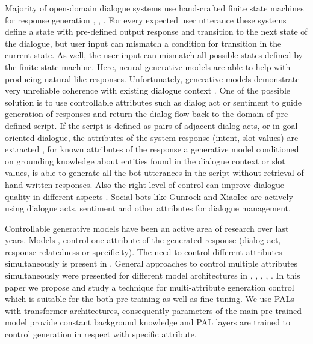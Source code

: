 \documentclass[11pt]{article}
\begin{document}
Majority of open-domain dialogue systems use hand-crafted finite state machines for response generation \cite{larsson2000information}, \cite{bocklisch2017rasa}, \cite{finch2020emora}. For every expected user utterance these systems define a state with pre-defined output response and transition to the next state of the dialogue, but user input can mismatch a condition for transition in the current state.  As well, the user input can mismatch all possible states defined by the finite state machine. Here, neural generative models are able to help with producing natural like responses. Unfortunately, generative models demonstrate very unreliable coherence with existing dialogue context \cite{abhishek2021transformer}. One of the possible solution is to use controllable attributes such as dialog act or sentiment to guide generation of responses and return the dialog flow back to the domain of pre-defined script. If the script is defined as pairs of adjacent dialog acts, or in goal-oriented dialogue, the attributes of the system response (intent, slot values) are extracted \cite{wu-etal-2019-transferable}, for known attributes of the response a generative model conditioned on grounding knowledge about entities found in the dialogue context or slot values, is able to generate all the bot utterances in the script without retrieval of hand-written responses. Also the right level of control can improve dialogue quality in different aspects \cite{see2019makes}. Social bots like Gunrock \cite{gunrock} and XiaoIce \cite{zhou2019design} are actively using dialogue acts, sentiment and other attributes for dialogue management.

Controllable generative models have been an active area of research over last years. Models \cite{zhao2017learning}, \cite{zhang2018learning} control one attribute of the generated response (dialog act, response relatedness or specificity). The need to control different attributes simultaneously is present in \cite{see2019makes}. General approaches to control multiple attributes simultaneously were presented for different model architectures in \cite{hu2021controllable}, \cite{neural_meta_words}, \cite{attr_alignment}, \cite{side_control}, \cite{phed}. In this paper we propose and study a technique for multi-attribute generation control which is suitable for the both pre-training as well as fine-tuning. We use PALs \cite{stickland2019bert} with transformer architectures, consequently parameters of the main pre-trained model provide constant background knowledge and PAL layers are trained to control generation in respect with specific attribute.
\end{document}
